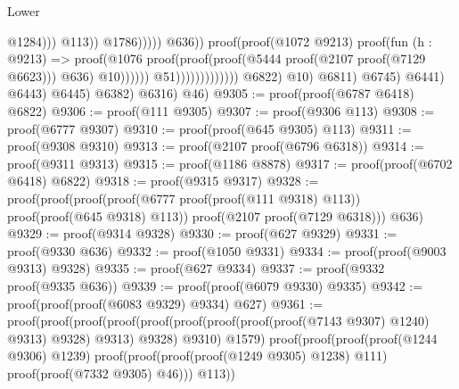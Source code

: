 \begin{lexlean}{Lower}
\begin{coremodule}
                                                                                                    @1284)))
                                                                                          @113))
                                                                                    @1786)))))
                                                                  @636))
                                                            proof(proof(@1072 @9213)
                                                                proof(fun (h : @9213) =>
                                                                  proof(@1076
                                                                      proof(proof(proof(@5444
                                                                              proof(@2107
                                                                                  proof(@7129
                                                                                      @6623)))
                                                                            @636)
                                                                          @10))))))
                                                      @51)))))))))))))
                        @6822)
                      @10)
                    @6811)
                  @6745)
                @6441)
              @6443)
            @6445)
          @6382)
        @6316)
      @46)
@9305 := proof(proof(@6787 @6418) @6822)
@9306 := proof(@111 @9305)
@9307 := proof(@9306 @113)
@9308 := proof(@6777 @9307)
@9310 := proof(proof(@645 @9305) @113)
@9311 := proof(@9308 @9310)
@9313 := proof(@2107 proof(@6796 @6318))
@9314 := proof(@9311 @9313)
@9315 := proof(@1186 @8878)
@9317 := proof(proof(@6702 @6418) @6822)
@9318 := proof(@9315 @9317)
@9328 := proof(proof(proof(proof(@6777 proof(proof(@111 @9318) @113)) proof(proof(@645 @9318) @113))
        proof(@2107 proof(@7129 @6318)))
      @636)
@9329 := proof(@9314 @9328)
@9330 := proof(@627 @9329)
@9331 := proof(@9330 @636)
@9332 := proof(@1050 @9331)
@9334 := proof(proof(@9003 @9313) @9328)
@9335 := proof(@627 @9334)
@9337 := proof(@9332 proof(@9335 @636))
@9339 := proof(proof(@6079 @9330) @9335)
@9342 := proof(proof(proof(@6083 @9329) @9334) @627)
@9361 := proof(proof(proof(proof(proof(proof(proof(proof(proof(@7143 @9307) @1240) @9313) @9328)
              @9313)
            @9328)
          @9310)
        @1579)
      proof(proof(proof(proof(@1244 @9306) @1239)
            proof(proof(proof(proof(@1249 @9305) @1238) @111) proof(proof(@7332 @9305) @46)))
          @113))

\end{coremodule}
\end{lexlean}
